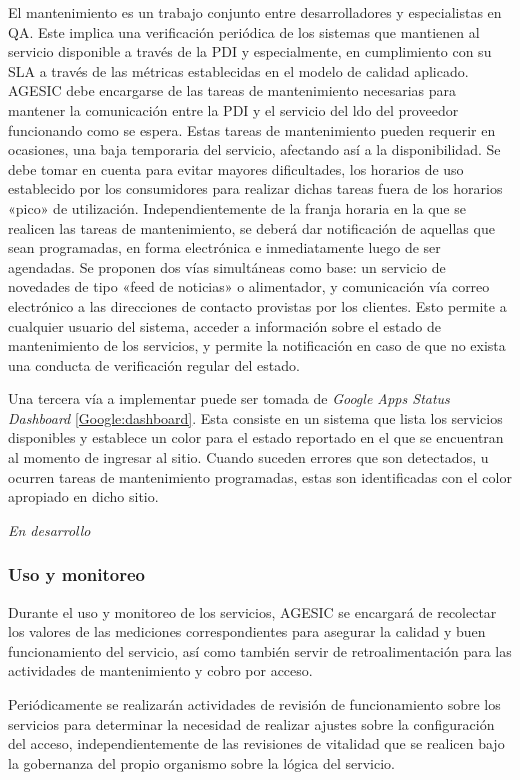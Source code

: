 \documentclass[11pt]{article}
\begin{document}
				El mantenimiento es un trabajo conjunto entre desarrolladores y especialistas en QA. Este implica una verificación periódica de los sistemas que mantienen al servicio disponible a través de la PDI y especialmente, en cumplimiento con su SLA a través de las métricas establecidas en el modelo de calidad aplicado. AGESIC debe encargarse de las tareas de mantenimiento necesarias para mantener la comunicación entre la PDI y el servicio del ldo del proveedor funcionando como se espera. Estas tareas de mantenimiento pueden requerir en ocasiones, una baja temporaria del servicio, afectando así a la disponibilidad. Se debe tomar en cuenta para evitar mayores dificultades, los horarios de uso establecido por los consumidores para realizar dichas tareas fuera de los horarios «pico» de utilización. Independientemente de la franja horaria en la que se realicen las tareas de mantenimiento, se deberá dar notificación de aquellas que sean programadas, en forma electrónica e inmediatamente luego de ser agendadas. Se proponen dos vías simultáneas como base: un servicio de novedades de tipo «feed de noticias» o alimentador, y comunicación vía correo electrónico a las direcciones de contacto provistas por los clientes. Esto permite a cualquier usuario del sistema, acceder a información sobre el estado de mantenimiento de los servicios, y permite la notificación en caso de que no exista una conducta de verificación regular del estado.

				Una tercera vía a implementar puede ser tomada de \emph{Google Apps Status Dashboard} \ref{Google:dashboard}. Esta consiste en un sistema que lista los servicios disponibles y establece un color para el estado reportado en el que se encuentran al momento de ingresar al sitio. Cuando suceden errores que son detectados, u ocurren tareas de mantenimiento programadas, estas son identificadas con el color apropiado en dicho sitio.

				\emph{En desarrollo}

			\subsubsection{Uso y monitoreo}
				Durante el uso y monitoreo de los servicios, AGESIC se encargará de recolectar los valores de las mediciones correspondientes para asegurar la calidad y buen funcionamiento del servicio, así como también servir de retroalimentación para las actividades de mantenimiento y cobro por acceso.

				Periódicamente se realizarán actividades de revisión de funcionamiento sobre los servicios para determinar la necesidad de realizar ajustes sobre la configuración del acceso, independientemente de las revisiones de vitalidad que se realicen bajo la gobernanza del propio organismo sobre la lógica del servicio.
\end{document}
